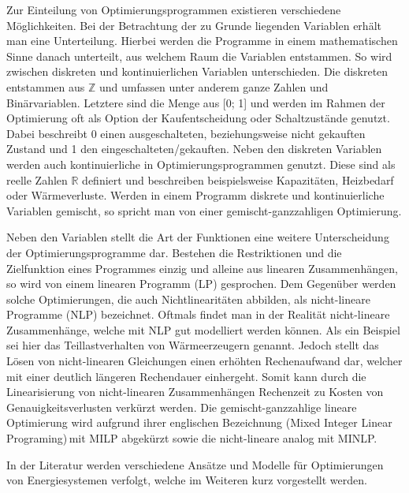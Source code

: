 Zur Einteilung von Optimierungsprogrammen existieren verschiedene Möglichkeiten.
Bei der Betrachtung der zu Grunde liegenden Variablen erhält man eine Unterteilung.
Hierbei werden die Programme in einem mathematischen Sinne danach unterteilt, aus welchem Raum die Variablen entstammen.
So wird zwischen diskreten und kontinuierlichen Variablen unterschieden. 
Die diskreten entstammen aus \(\mathbb{Z	}\) und umfassen unter anderem ganze Zahlen und Binärvariablen.
Letztere sind die Menge aus [0; 1] und werden im Rahmen der Optimierung oft als Option der Kaufentscheidung oder Schaltzustände genutzt. %
Dabei beschreibt 0 einen ausgeschalteten, beziehungsweise nicht gekauften Zustand und 1 den eingeschalteten/gekauften.
Neben den diskreten Variablen werden auch kontinuierliche in Optimierungsprogrammen genutzt. 
Diese sind als reelle Zahlen \(\mathbb{R}\) definiert und beschreiben beispielsweise Kapazitäten, Heizbedarf oder Wärmeverluste.
Werden in einem Programm diskrete und kontinuierliche Variablen gemischt, so spricht man von einer gemischt-ganzzahligen Optimierung. \cite{Schellong.2016}

Neben den Variablen stellt die Art der Funktionen eine weitere Unterscheidung der Optimierungsprogramme dar.
Bestehen die Restriktionen und die Zielfunktion eines Programmes einzig und alleine aus linearen Zusammenhängen, so wird von einem linearen Programm (LP) gesprochen.
Dem Gegenüber werden solche Optimierungen, die auch Nichtlinearitäten abbilden, als nicht-lineare Programme (NLP) bezeichnet.
Oftmals findet man in der Realität nicht-lineare Zusammenhänge, welche mit NLP gut modelliert werden können.
Als ein Beispiel sei hier das Teillastverhalten von Wärmeerzeugern genannt.
Jedoch stellt das Lösen von nicht-linearen Gleichungen einen erhöhten Rechenaufwand dar, welcher mit einer deutlich längeren Rechendauer einhergeht.
Somit kann durch die Linearisierung von nicht-linearen Zusammenhängen Rechenzeit zu Kosten von Genauigkeitsverlusten verkürzt werden. 
Die gemischt-ganzzahlige lineare Optimierung wird aufgrund ihrer englischen Bezeichnung (\glqq Mixed Integer Linear Programing\grqq)\,mit MILP abgekürzt sowie die nicht-lineare analog mit MINLP. \cite{Samsatli.2018} %

In der Literatur werden verschiedene Ansätze und Modelle für Optimierungen von Energiesystemen verfolgt, welche im Weiteren kurz vorgestellt werden.


